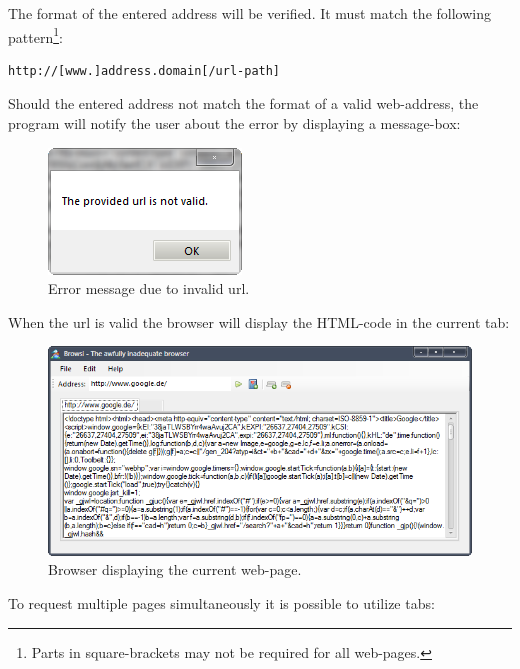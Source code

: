 The format of the entered address will be verified. It must match the following pattern\footnote{Parts in square-brackets may not be required for all web-pages.}:

\begin{lstlisting}[language=xml]
http://[www.]address.domain[/url-path]
\end{lstlisting}

Should the entered address not match the format of a valid web-address, the program will notify the user about the error by displaying a message-box:

\begin{figure}[H]
\begin{center}
\includegraphics[scale=1]{gfx/error_message.png}
\caption{Error message due to invalid url.}
\label{fig:error_message}
\end{center}
\end{figure}

When the url is valid the browser will display the \ac{HTML}-code in the current tab:

\begin{figure}[H]
\begin{center}
\includegraphics[width=\textwidth]{gfx/display_page.png}
\caption{Browser displaying the current web-page.}
\label{fig:display_page}
\end{center}
\end{figure}

To request multiple pages simultaneously it is possible to utilize tabs:

